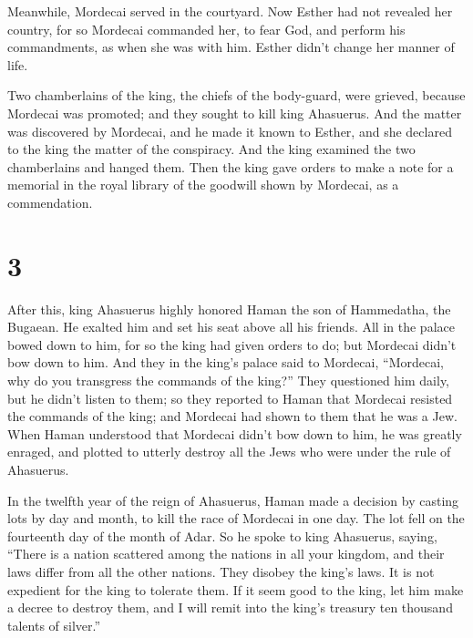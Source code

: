  Meanwhile, Mordecai served in the courtyard. 
Now Esther had not revealed her country, for so Mordecai commanded her,
to fear God, and perform his commandments, as when she was with him.
Esther didn't change her manner of life.

 Two chamberlains of the king, the chiefs of the
body-guard, were grieved, because Mordecai was promoted; and they sought
to kill king Ahasuerus.  And the matter was discovered by
Mordecai, and he made it known to Esther, and she declared to the king
the matter of the conspiracy.  And the king examined the
two chamberlains and hanged them. Then the king gave orders to make a
note for a memorial in the royal library of the goodwill shown by
Mordecai, as a commendation.

\hypertarget{section-2}{%
\section{3}\label{section-2}}

 After this, king Ahasuerus highly honored Haman the son of
Hammedatha, the Bugaean. He exalted him and set his seat above all his
friends.  All in the palace bowed down to him, for so the
king had given orders to do; but Mordecai didn't bow down to him.
 And they in the king's palace said to Mordecai, ``Mordecai,
why do you transgress the commands of the king?''  They
questioned him daily, but he didn't listen to them; so they reported to
Haman that Mordecai resisted the commands of the king; and Mordecai had
shown to them that he was a Jew.  When Haman understood that
Mordecai didn't bow down to him, he was greatly enraged, 
and plotted to utterly destroy all the Jews who were under the rule of
Ahasuerus.

 In the twelfth year of the reign of Ahasuerus, Haman made a
decision by casting lots by day and month, to kill the race of Mordecai
in one day. The lot fell on the fourteenth day of the month of Adar.
 So he spoke to king Ahasuerus, saying, ``There is a nation
scattered among the nations in all your kingdom, and their laws differ
from all the other nations. They disobey the king's laws. It is not
expedient for the king to tolerate them.  If it seem good to
the king, let him make a decree to destroy them, and I will remit into
the king's treasury ten thousand talents of silver.''

